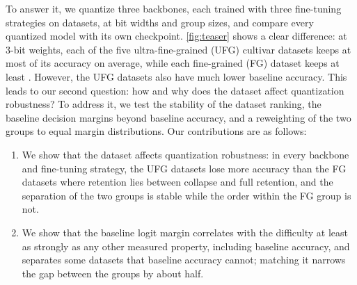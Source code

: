 To answer it, we quantize three backbones, each trained with three fine-tuning strategies on  datasets, at  bit widths and  group sizes, and compare every quantized model with its own checkpoint.
\cref{fig:teaser} shows a clear difference: at 3-bit weights, each of the five ultra-fine-grained (UFG) cultivar datasets keeps at most  of its accuracy on average, while each fine-grained (FG) dataset keeps at least .
However, the UFG datasets also have much lower baseline accuracy.
This leads to our second question: how and why does the dataset affect quantization robustness?
To address it, we test the stability of the dataset ranking, the baseline decision margins beyond baseline accuracy, and a reweighting of the two groups to equal margin distributions.
Our contributions are as follows:
\begin{enumerate}
  \item We show that the dataset affects quantization robustness: in every backbone and fine-tuning strategy, the UFG datasets lose more accuracy than the FG datasets where retention lies between collapse and full retention, and the separation of the two groups is stable while the order within the FG group is not.
  \item We show that the baseline logit margin correlates with the difficulty at least as strongly as any other measured property, including baseline accuracy, and separates some datasets that baseline accuracy cannot; matching it narrows the gap between the groups by about half.
\end{enumerate}
